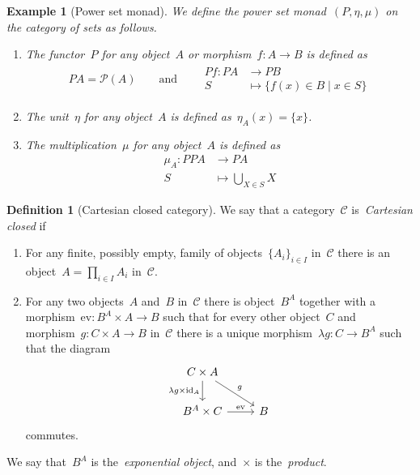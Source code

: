 \documentclass[a4paper]{article}
\theoremstyle{plain}
\newtheorem{example}[theorem]{Example}
\theoremstyle{definition}
\newtheorem{definition}[theorem]{Definition}
\newcommand{\id}{\mathrm{id}}
\newcommand{\ev}{\mathrm{ev}}
\newcommand{\cat}[1]{\mathcal{#1}}
\begin{document}
\begin{example}[Power set monad]
    \label{monad:power-set}
    We define the power set monad~\((P,\eta,\mu)\) on the category of sets as
    follows.
    \begin{enumerate}
        \item The functor~\(P\) for any object~\(A\) or
            morphism~\(f:A\longrightarrow B\) is defined as
            \begin{gather*}
                PA = \mathcal{P}(A)
                \qquad\text{and}\qquad
                \begin{split}
                    Pf:PA&\longrightarrow PB \\
                    S&\longmapsto\{f(x)\in B \mid x\in S\}
                \end{split}
            \end{gather*}
        \item The unit~\(\eta\) for any object~\(A\) is defined
            as~\(\eta_{A}(x)=\{x\}\).
        \item The multiplication~\(\mu\) for any object~\(A\) is defined as
            \begin{align*}
                \mu_{A}:PPA&\longrightarrow PA \\
                S&\longmapsto \bigcup_{X\in S}X
            \end{align*}
    \end{enumerate}
\end{example}

\begin{definition}[Cartesian closed category]
    \label{def:product}
    \label{def:cartesian-closed}
    \label{def:exponential object}
    We say that a category~\(\cat{C}\) is~\emph{Cartesian closed} if
    \begin{enumerate}
        \item For any finite, possibly empty, family of
            objects~\(\{A_{i}\}_{i\in I}\) in~\(\cat{C}\) there is an
            object~\(A=\prod_{i\in I}A_{i}\) in~\(\cat{C}\).
        \item For any two objects~\(A\) and~\(B\) in~\(\cat{C}\) there is
            object~\(B^{A}\) together with a
            morphism~\(\ev:B^{A}\times A\longrightarrow B\) such that for every
            other object~\(C\) and morphism~\(g:C\times A\longrightarrow B\)
            in~\(\cat{C}\) there is a unique
            morphism~\(\lambda g:C\longrightarrow B^{A}\) such that the diagram
            \[\begin{tikzcd}
                C\times A \arrow[dr, "g"] \arrow[d, "\lambda g\times\id_{A}", swap] & \\
                B^{A}\times C \arrow[r, "\ev"] & B
            \end{tikzcd}\]
            commutes.
    \end{enumerate}
    We say that~\(B^{A}\) is the~\emph{exponential object}, and~\(\times\) is
    the~\emph{product}.
\end{definition}
\end{document}
